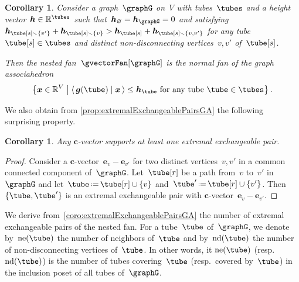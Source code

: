 \documentclass{amsart}
\newtheorem{corollary}[theorem]{Corollary}
\theoremstyle{definition}
\newcommand{\R}{\mathbb{R}} %
\renewcommand{\b}[1]{{\boldsymbol{#1}}} %
\newcommand{\set}[2]{\left\{ #1 \;\middle|\; #2 \right\}} %
\newcommand{\ssm}{\smallsetminus} %
\newcommand{\dotprod}[2]{\left\langle \, #1 \; \middle| \; #2 \, \right\rangle} %
\newcommand{\eqdef}{\mbox{\,\raisebox{0.2ex}{\scriptsize\ensuremath{\mathrm:}}\ensuremath{=}\,}} %
\newcommand{\gvector}[1]{\b{g}(#1)} %
\newcommand{\ground}{V} %
\newcommand{\nonDisconnecting}{\mathrm{nd}} %
\newcommand{\neighbors}{\mathrm{ne}} %
\begin{document}
\begin{corollary}
Consider a graph~$\graphG$ on~$\ground$ with tubes~$\tubes$ and a height vector~$\b{h} \in \R^{\tubes}$ such that~$\b{h}_{\varnothing} = \b{h}_{\graphG} = 0$ and satisfying 
 $\b{h}_{\tube[s] \ssm \{v'\}} + \b{h}_{\tube[s] \ssm \{v\}} > \b{h}_{\tube[s]} + \b{h}_{\tube[s] \ssm \{v, v'\}}$ for any tube~$\tube[s] \in \tubes$ and distinct non-disconnecting vertices~$v,v'$ of~$\tube[s]$. 

Then the nested fan~$\gvectorFan[\graphG]$ is the normal fan of the graph associahedron
\[
\set{\b{x} \in \R^\ground}{\dotprod{\gvector{\tube}}{\b{x}} \le \b{h}_{\tube} \text{ for any tube } \tube \in \tubes}.
\]
\end{corollary}

We also obtain from \cref{prop:extremalExchangeablePairsGA} the following surprising property.

\begin{corollary}
Any $\b{c}$-vector supports at least one extremal exchangeable pair.
\end{corollary}

\begin{proof}
Consider a $\b{c}$-vector~$\b{e}_v - \b{e}_{v'}$ for two distinct vertices~$v, v'$ in a common connected component of~$\graphG$. Let~$\tube[r]$ be a path from~$v$ to~$v'$ in~$\graphG$ and let~$\tube \eqdef \tube[r] \cup \{v\}$ and~$\tube' \eqdef \tube[r] \cup \{v'\}$. Then $\{\tube, \tube'\}$ is an extremal exchangeable pair with $\b{c}$-vector~$\b{e}_v - \b{e}_{v'}$.
\end{proof}

We derive from~\cref{coro:extremalExchangeablePairsGA} the number of extremal exchangeable pairs of the nested fan.
For a tube~$\tube$ of~$\graphG$, we denote by~$\neighbors(\tube)$ the number of neighbors of~$\tube$ and by~$\nonDisconnecting(\tube)$ the number of non-disconnecting vertices of~$\tube$.
In other words, it $\neighbors(\tube)$ (resp.~$\nonDisconnecting(\tube)$) is the number of tubes covering~$\tube$ (resp.~covered by~$\tube$) in the inclusion poset of all tubes of~$\graphG$.
\end{document}
